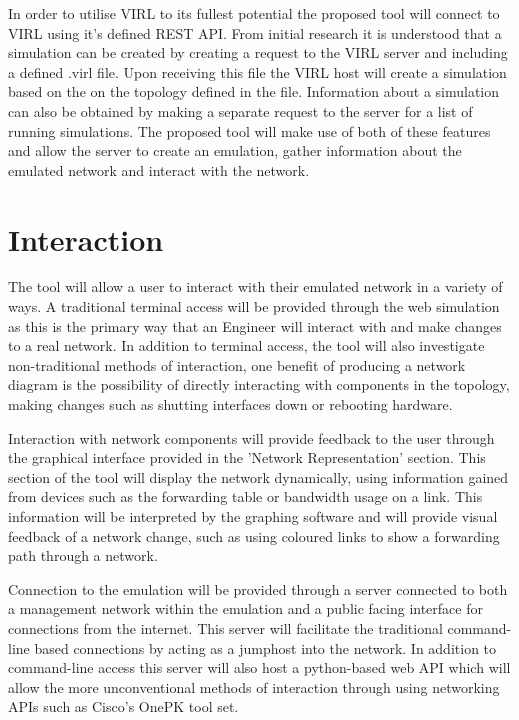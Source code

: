 \documentclass[11pt]{report}
\begin{document}
In order to utilise VIRL to its fullest potential the proposed tool will connect to VIRL using it's defined REST API. From initial research it is understood that a simulation can be created by creating a request to the VIRL server and including a defined .virl file. Upon receiving this file the VIRL host will create a simulation based on the on the topology defined in the file. Information about a simulation can also be obtained by making a separate request to the server for a list of running simulations. The proposed tool will make use of both of these features and allow the server to create an emulation, gather information about the emulated network and interact with the network.

\section{Interaction}

The tool will allow a user to interact with their emulated network in a variety of ways. A traditional terminal access will be provided through the web simulation as this is the primary way that an Engineer will interact with and make changes to a real network. In addition to terminal access, the tool will also investigate non-traditional methods of interaction, one benefit of producing a network diagram is the possibility of directly interacting with components in the topology, making changes such as shutting interfaces down or rebooting hardware.

Interaction with network components will provide feedback to the user through the graphical interface provided in the 'Network Representation' section. This section of the tool will display the network dynamically, using information gained from devices such as the forwarding table or bandwidth usage on a link. This information will be interpreted by the graphing software and will provide visual feedback of a network change, such as using coloured links to show a forwarding path through a network.

Connection to the emulation will be provided through a server connected to both a management network within the emulation and a public facing interface for connections from the internet. This server will facilitate the traditional command-line based connections by acting as a jumphost into the network. In addition to command-line access this server will also host a python-based web API which will allow the more unconventional methods of interaction through using networking APIs such as Cisco's OnePK tool set.
\end{document}
